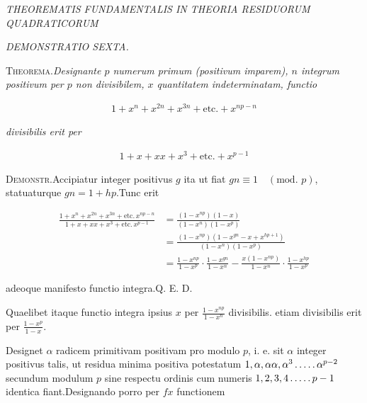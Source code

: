%
\begin{center}
\textit{THEOREMATIS FUNDAMENTALIS IN THEORIA RESIDUORUM QUADRATICORUM}\par
\textit{DEMONSTRATIO SEXTA.}
\end{center}


\textsc{Theorema.}\quad \textit{Designante $p$ numerum primum (positivum imparem), $n$ integrum} \textit{positivum per $p$ non divisibilem, $x$ quantitatem indeterminatam, functio}

\[
\begin{aligned}
1+x^n+x^{2n}+x^{3n}+\text{etc.}+x^{np-n}
\end{aligned}
\]

\textit{divisibilis erit per}

\[
\begin{aligned}
1+x+xx+x^3+\text{etc.}+x^{p-1}
\end{aligned}
\]

\textsc{Demonstr.}\quad Accipiatur integer positivus $g$ ita ut fiat $gn\equiv1\quad(\text{mod. }p)$, statuaturque $gn=1+hp$.\quad Tunc erit

{\small
\[
\begin{aligned}
\frac{1+x^n+x^{2n}+x^{3n}+\text{etc.}\,x^{np-n}}{1+x+xx+x^3+\text{etc.}\,x^{p-1}} &=\frac{(1-x^{np})(1-x)}{(1-x^n)(1-x^p)}\\&=\frac{(1-x^{np})(1-x^{gn}-x+x^{hp+1})}{(1-x^n)(1-x^p)}\\
&=\frac{1-x^{np}}{1-x^p}\cdot\frac{1-x^{gn}}{1-x^n}-\frac{x(1-x^{np})}{1-x^n}\cdot\frac{1-x^{hp}}{1-x^p}
\end{aligned}
\]
}

adeoque manifesto functio integra.\quad Q. E. D.

Quaelibet itaque functio integra ipsius $x$ per $\frac{1-x^{np}}{1-x^n}$ divisibilis. etiam divisibilis erit per $\frac{1-x^p}{1-x}$.


Designet $\alpha$ radicem primitivam positivam pro modulo $p$, i. e. sit $\alpha$ integer positivus talis, ut residua minima positiva potestatum $1,\alpha,\alpha\alpha,\alpha^3\mathinner{.\,.\,.\,.\,.}\alpha^{p-2}$ secundum modulum $p$ sine respectu ordinis cum numeris $1,2,3,4\mathinner{.\,.\,.\,.\,.} p-1$ identica fiant.\quad Designando porro per $fx$ functionem

